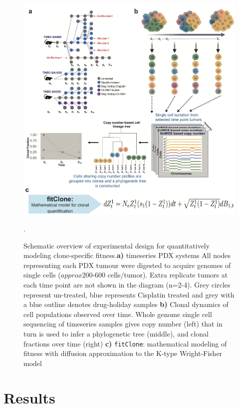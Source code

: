 \begin{figure}
\centering
\includegraphics[width=\textwidth]{Figures/chap4/fig1thesischap4.png}
\caption{Schematic overview of experimental design for quantitatively modeling clone-specific fitness.\textbf{a)} timeseries PDX systems All nodes representing each PDX tumour were digested to acquire genomes of single cells ($approx$200-600 cells/tumor). Extra replicate tumors at each time point are not shown in the diagram (n=2-4). Grey circles represent un-treated, blue represents Cisplatin treated and grey with a blue outline denotes drug-holiday samples \textbf{b)} Clonal dynamics of cell populations observed over time. Whole genome single cell sequencing of timeseries samples gives copy number (left) that in turn is used to infer a phylogenetic tree (middle), and clonal fractions over time (right) \textbf{c)} \texttt{fitClone}: mathematical modeling of fitness with diffusion approximation to the K-type Wright-Fisher model}.
\label{fig:schematic}
\end{figure}



\section{Results}

